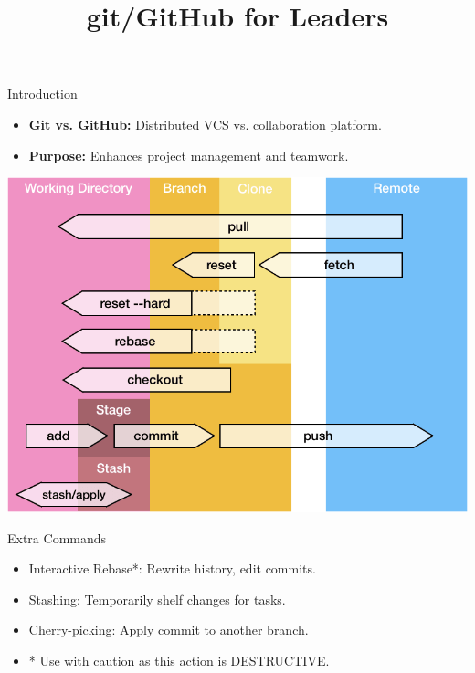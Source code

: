 \documentclass[aspectratio=169]{beamer}
\title{git/GitHub for Leaders}
\institute{Engineers for Exploration, UC San Diego}
\begin{document}
\maketitle
\begin{frame}{Introduction}
    \begin{itemize}
        \item \textbf{Git vs. GitHub:} Distributed VCS vs. collaboration platform.
        \item \textbf{Purpose:} Enhances project management and teamwork.
    \end{itemize}
    \begin{center}
        \includegraphics[scale=.25]{git_commands.png}
    \end{center}
\end{frame}
\begin{frame}{Extra Commands}
    \begin{itemize}
        \item Interactive Rebase*: Rewrite history, edit commits.
        \item Stashing: Temporarily shelf changes for tasks.
        \item Cherry-picking: Apply commit to another branch.
        \item * Use with caution as this action is DESTRUCTIVE.
    \end{itemize}
\end{frame}
\end{document}

